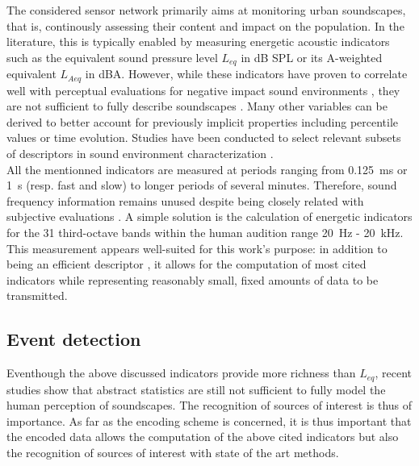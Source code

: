 \documentclass[final,3p,times,twocolumn]{elsarticle}
\begin{document}
The considered sensor network primarily aims at monitoring urban soundscapes, that is, continously assessing their content and impact on the population. In the literature, this is typically enabled by measuring energetic acoustic indicators such as the equivalent sound pressure level $L_{eq}$ in dB SPL or its A-weighted equivalent $L_{Aeq}$ in dBA. However, while these indicators have proven to correlate well with perceptual evaluations for negative impact sound environments \cite{gozalo2015}, they are not sufficient to fully describe soundscapes \cite{rychtarikova2013}. Many other variables can be derived to better account for previously implicit properties \cite{can2016} including percentile values or time evolution. Studies have been conducted to select relevant subsets of descriptors in sound environment characterization \cite{can2015, brocolini2013, nilsson2007}.\\

All the mentionned indicators are measured at periods ranging from 0.125~ms or 1~s (resp. fast and slow) to longer periods of several minutes. Therefore, sound frequency information remains unused despite being closely related with subjective evaluations \cite{ishiyama2000}. A simple solution is the calculation of energetic indicators for the 31 third-octave bands within the human audition range 20~Hz - 20~kHz.\\

This measurement appears well-suited for this work's purpose: in addition to being an efficient descriptor \cite{torija2013}, it allows for the computation of most cited indicators while representing reasonably small, fixed amounts of data to be transmitted.

\subsection{Event detection}

Eventhough the above discussed indicators provide more richness than $L_{eq}$, recent studies show that abstract statistics are still not sufficient to fully model the human perception of soundscapes. The recognition of sources of interest is thus of importance. As far as the encoding scheme is concerned, it is thus important that the encoded data allows the computation of the above cited indicators but also the recognition of sources of interest with state of the art methods.
\end{document}
